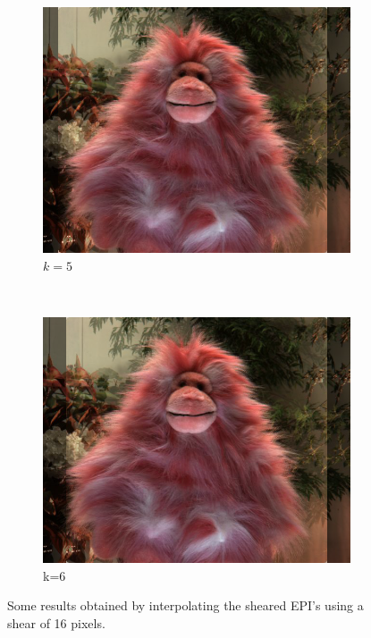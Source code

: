 \documentclass[a4paper]{article}
\begin{document}
\begin{figure}[ht]
	\vspace{2mm}
	\begin{subfigure}[h]{0.48\textwidth}
	  \centering
	  \includegraphics[width=\textwidth]{ShearedInterpolation58_63}
	  \caption*{$k=5$}
	\end{subfigure}
	~
	\begin{subfigure}[h]{0.48\textwidth}
	  \centering
	  \includegraphics[width=\textwidth]{ShearedInterpolation57_63}
	  \caption*{k=6}
	\end{subfigure}
\caption{Some results obtained by interpolating the sheared EPI's using a shear of 16 pixels.}
\label{fig:shearedInterpolationDifferentK}
\end{figure}
\end{document}
